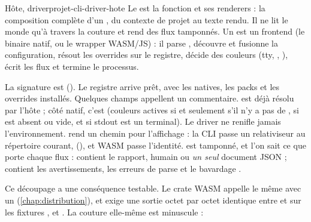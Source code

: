 
\begin{definition}{Hôte, driver}{projet-cli-driver-hote}
Le  est la fonction  et ses renderers : la composition complète d'un , du contexte de projet au texte rendu. Il ne lit le monde qu'à travers la couture  et rend des flux tamponnés. Un  est un frontend (le binaire natif, ou le wrapper WASM/JS) : il parse , découvre et fusionne la configuration, résout les overrides sur le registre, décide des couleurs (tty, , ), écrit les flux et termine le processus.
\end{definition}


La signature est  (). Le registre arrive prêt, avec les natives, les packs et les overrides installés. Quelques champs appellent un commentaire.  est déjà résolu par l'hôte ; côté natif, c'est  (couleurs actives si et seulement s'il n'y a pas de , si  est absent ou vide, et si stdout est un terminal). Le driver ne \og renifle\fg{} jamais l'environnement.  rend un chemin pour l'affichage : la CLI passe un relativiseur au répertoire courant,  (), et WASM passe l'identité.  est tamponné, et l'on sait ce que porte chaque flux :  contient le rapport, humain ou \emph{un seul} document JSON ;  contient les avertissements, les erreurs de parse et le bavardage .

Ce découpage a une conséquence testable. Le crate WASM appelle le même  avec un  (\cref{chap:distribution}), et  exige une sortie octet par octet identique entre  et  sur les fixtures ,  et . La couture elle-même est minuscule :


